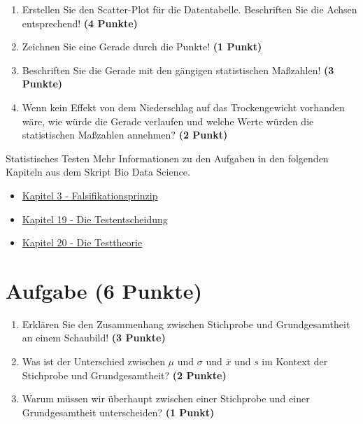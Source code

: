 \documentclass[a4paper, 10pt]{scrartcl}\usepackage[]{graphicx}\usepackage[]{xcolor}
\begin{document}
\begin{enumerate}
\item Erstellen Sie den Scatter-Plot f{\"u}r die Datentabelle. Beschriften Sie
  die Achsen entsprechend! \textbf{(4 Punkte)}
\item Zeichnen Sie eine Gerade durch die Punkte! \textbf{(1 Punkt)}
\item Beschriften Sie die Gerade mit den g{\"a}ngigen statistischen Ma{\ss}zahlen! \textbf{(3 Punkte)}
\item Wenn kein Effekt von dem Niederschlag auf das Trockengewicht
  vorhanden w{\"a}re, wie w{\"u}rde die Gerade verlaufen und welche Werte w{\"u}rden die
  statistischen Ma{\ss}zahlen annehmen? \textbf{(2 Punkt)}
\end{enumerate} 
\clearpage
\begin{graybox}{Statistisches Testen}
Mehr Informationen zu den Aufgaben in den folgenden Kapiteln aus dem Skript Bio Data Science.
  \begin{itemize}
  \item \href{https://jkruppa.github.io/preface.html#lernziel-3-falsifikationsprinzip}{Kapitel 3 - Falsifikationsprinzip}
  \item \href{https://jkruppa.github.io/stat-tests-basic.html}{Kapitel 19 - Die Testentscheidung}
  \item \href{https://jkruppa.github.io/stat-tests-theorie.html}{Kapitel 20 - Die Testtheorie}
  \end{itemize}
\end{graybox}

\section{Aufgabe \hfill (6 Punkte)}

\begin{enumerate}
\item Erkl{\"a}ren Sie den Zusammenhang zwischen Stichprobe und Grundgesamtheit
  an einem Schaubild! \textbf{(3 Punkte)}
\item Was ist der Unterschied zwischen $\mu$ und $\sigma$ und $\bar{x}$ und
  $s$ im Kontext der Stichprobe und Grundgesamtheit? \textbf{(2 Punkte)}
\item Warum m{\"u}ssen wir {\"u}berhaupt zwischen einer Stichprobe und einer
  Grundgesamtheit unterscheiden? \textbf{(1 Punkt)}
\end{enumerate} 
\clearpage
\end{document}
